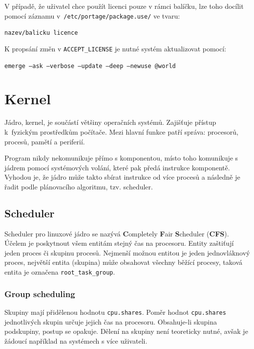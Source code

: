 \documentclass[12pt,a4paper,twoside,]{article}
\begin{document}
{V případě, že uživatel chce použít licenci pouze v rámci balíčku, lze toho docílit pomocí záznamu v~\texttt{/etc/portage/package.use/} ve tvaru:

\texttt{nazev/balicku licence}

K propsání změn v \texttt{ACCEPT\_LICENSE} je nutné systém aktualizovat pomocí:

\texttt{emerge --ask --verbose --update --deep --newuse @world}


\newpage

\section{\textsf{Kernel}}\hypertarget{Kernel}{}
Jádro, kernel, je součástí většiny operačních systémů. Zajišťuje přístup k~fyzickým prostředkům počítače. Mezi hlavní funkce patří správa: procesorů, procesů, pamětí a periferií. 

Program nikdy nekomunikuje přímo s komponentou, místo toho komunikuje s jádrem pomocí systémových volání, které pak předá instrukce komponentě. Vyhodou je, že jádro může takto sbírat instrukce od více procesů a následně je řadit podle plánovacího algoritmu, tzv. scheduler.

\subsection{\textsf{Scheduler}}
Scheduler pro linuxové jádro se nazývá {\bf C}ompletely {\bf F}air {\bf S}cheduler ({\bf CFS}). Účelem je poskytnout všem entitám stejný čas na procesoru. Entity zaštiťují jeden proces či skupinu procesů. Nejmenší možnou entitou je jeden jednovláknový proces, největší entita (skupina) může obsahovat všechny běžící procesy, taková entita je označena \texttt{root\_task\_group}. 
\subsubsection{\textsf{Group scheduling}}
Skupiny mají přidělenou hodnotu \texttt{cpu.shares}. Poměr hodnot \texttt{cpu.shares} jednotlivých skupin určuje jejich čas na procesoru. Obsahuje-li skupina podskupiny, postup se opakuje. Dělení na skupiny není teoreticky nutné, avšak je žádoucí například na systémech s více uživateli.
}
\end{document}
